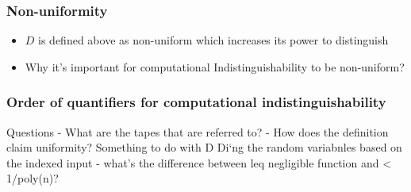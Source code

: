 \subsubsection*{Non-uniformity}
\begin{itemize}
    \item $D$ is defined above as non-uniform which increases its power to distinguish
    \item Why it's important for computational Indistinguishability to be non-uniform? 
\end{itemize}

\subsubsection*{Order of quantifiers for computational indistinguishability}


Questions
- What are the tapes that are referred to?
- How does the definition claim uniformity? Something to do with D Di`ng the random variabnles based on the indexed input
- what's the difference between leq negligible function and < 1/poly(n)?
